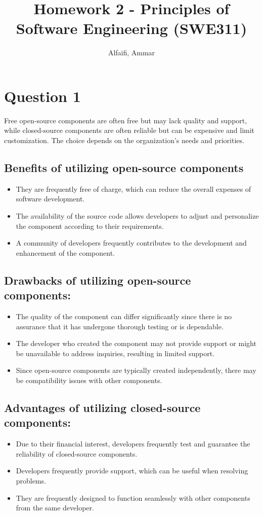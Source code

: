 \documentclass{article}
\title{Homework 2 - Principles of Software Engineering (SWE311)}
\author{Alfaifi, Ammar}
\date{}
\begin{document}
\maketitle

\section*{Question 1}%

Free open-source components are often free but may lack quality and support,
while closed-source components are often reliable but can be expensive and
limit customization. The choice depends on the organization's needs and priorities.

\subsection*{Benefits of utilizing open-source components}
\begin{itemize}
	\item They are frequently free of charge, which can reduce the overall expenses of software development.
	\item The availability of the source code allows developers to adjust and personalize the component according to their requirements.
	\item A community of developers frequently contributes to the development and enhancement of the component.
\end{itemize}

\subsection*{Drawbacks of utilizing open-source components:}

\begin{itemize}
	\item The quality of the component can differ significantly since there is no assurance that it has undergone thorough testing or is dependable.
	\item The developer who created the component may not provide support or might be unavailable to address inquiries, resulting in limited support.
	\item Since open-source components are typically created independently, there may be compatibility issues with other components.
\end{itemize}

\subsection*{Advantages of utilizing closed-source components:}
\begin{itemize}

	\item Due to their financial interest, developers frequently test and guarantee the reliability of closed-source components.
	\item Developers frequently provide support, which can be useful when resolving problems.
	\item They are frequently designed to function seamlessly with other components from the same developer.
\end{itemize}
\end{document}

